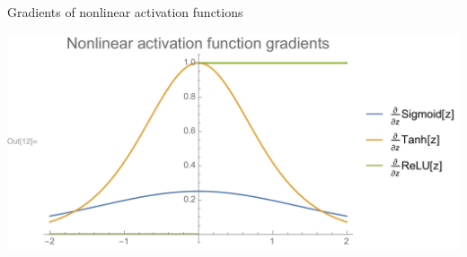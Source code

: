 \documentclass[xetex,compress]{beamer}
\begin{document}

\begin{frame}{Gradients of nonlinear activation functions}
  \begin{center}
    \includegraphics[width=1.00\textwidth]{./figures/nonlinear_activation_gradients.pdf}
  \end{center}
\end{frame}

\end{document}

